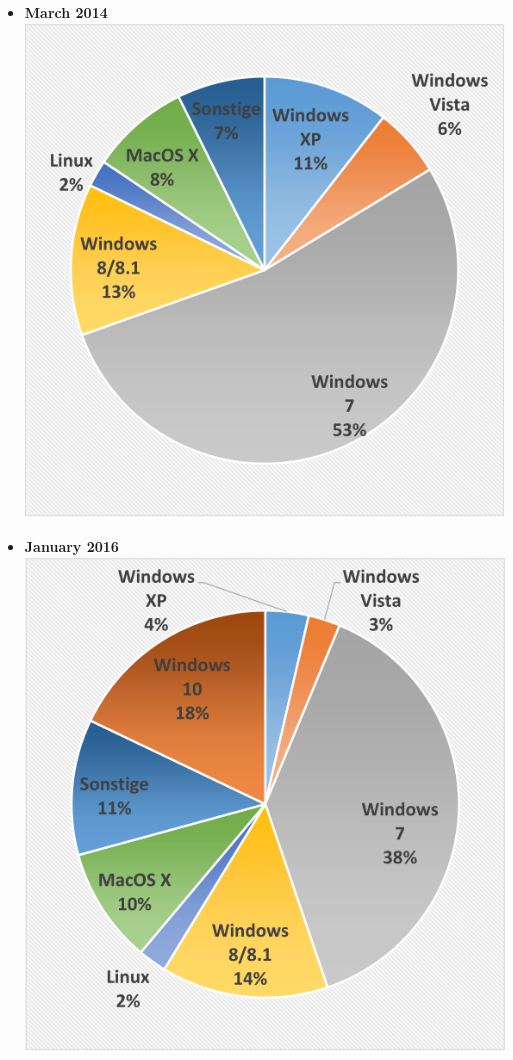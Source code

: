 \begin{itemize}
\item
  \textbf{March 2014} \includegraphics{images/os_dist_g_2014.png}
\item
  \textbf{January 2016} \includegraphics{images/os_dist_g_2016.png}

\end{itemize}

